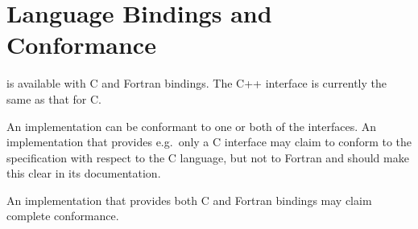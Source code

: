 \section{Language Bindings and Conformance}

\openshmem is available with C and Fortran bindings.  The C++
interface is currently the same as that for C.

An \openshmem implementation can be conformant to one or both of the
interfaces.  An implementation that provides e.g.\ only a C interface
may claim to conform to the \openshmem specification with respect to
the C language, but not to Fortran and should make this clear in its
documentation.

An implementation that provides both C and Fortran bindings may claim
complete conformance.

